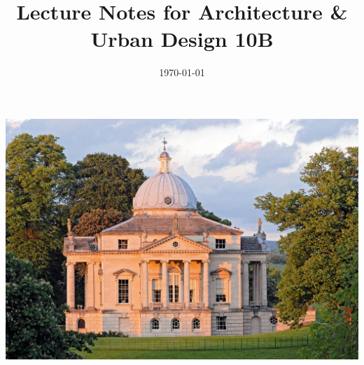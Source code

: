 \documentclass{article}
\date{\today}
\title{Lecture Notes for Architecture \& Urban Design 10B}
\begin{document}
    \maketitle
    \thispagestyle{empty}
    \begin{center}
        \includegraphics[width=\textwidth]{villa la rotonda.jpg}
    \end{center}
    \tableofcontents
    \newpage
    
    
    
    
    
    
    
    
    
    
    
    
    
    
    
    
    
\end{document}
